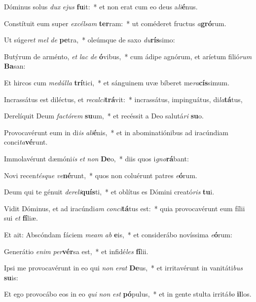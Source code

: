 \item Dóminus solus \textit{dux} \textit{e}\textit{jus} \textbf{fu}it:~* et non erat cum eo deus a\textit{li}\textbf{é}nus.
\item Constítuit eum super \textit{ex}\textit{cél}\textit{sam} \textbf{ter}ram:~* ut coméderet fructus \textit{a}\textbf{gró}rum.
\item Ut súge\textit{ret} \textit{mel} \textit{de} \textbf{pe}tra,~* oleúmque de saxo \textit{du}\textbf{rís}simo:
\item Butýrum de arménto, \textit{et} \textit{lac} \textit{de} \textbf{ó}vibus,~* cum ádipe agnórum, et aríetum filió\textit{rum} \textbf{Ba}san:
\item Et hircos cum \textit{me}\textit{dúl}\textit{la} \textbf{trí}tici,~* et sánguinem uvæ bíberet me\textit{ra}\textbf{cís}simum.
\item Incrassátus est diléctus, et \textit{re}\textit{cal}\textit{ci}\textbf{trá}vit:~* incrassátus, impinguátus, di\textit{la}\textbf{tá}tus,
\item Derelíquit Deum \textit{fac}\textit{tó}\textit{rem} \textbf{su}um,~* et recéssit a Deo salutá\textit{ri} \textbf{su}o.
\item Provocavérunt eum in di\textit{is} \textit{a}\textit{li}\textbf{é}nis,~* et in abominatiónibus ad iracúndiam conci\textit{ta}\textbf{vé}runt.
\item Immolavérunt dæmóni\textit{is} \textit{et} \textit{non} \textbf{De}o,~* diis quos i\textit{gno}\textbf{rá}bant:
\item Novi recen\textit{tés}\textit{que} \textit{ve}\textbf{né}runt,~* quos non coluérunt patres \textit{e}\textbf{ó}rum.
\item Deum qui te génuit \textit{de}\textit{re}\textit{li}\textbf{quís}ti,~* et oblítus es Dómini creató\textit{ris} \textbf{tu}i.
\item Vidit Dóminus, et ad iracúndi\textit{am} \textit{con}\textit{ci}\textbf{tá}tus est:~* quia provocavérunt eum fílii sui \textit{et} \textbf{fí}liæ.
\item Et ait: Abscóndam fáciem \textit{me}\textit{am} \textit{ab} \textbf{e}is,~* et considerábo novíssima \textit{e}\textbf{ó}rum:
\item Generátio \textit{e}\textit{nim} \textit{per}\textbf{vér}sa est,~* et infidé\textit{les} \textbf{fí}lii.
\item Ipsi me provocavérunt in eo qui \textit{non} \textit{e}\textit{rat} \textbf{De}us,~* et irritavérunt in vanitáti\textit{bus} \textbf{su}is:
\item Et ego provocábo eos in eo \textit{qui} \textit{non} \textit{est} \textbf{pó}pulus,~* et in gente stulta irritá\textit{bo} \textbf{il}los.
